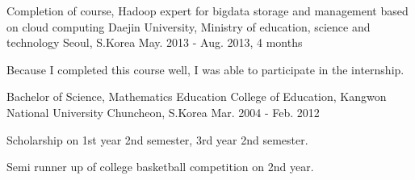 

\begin{cventries}

  \cventry
    {Completion of course, Hadoop expert for bigdata storage and management based on cloud computing} %
    {Daejin University, Ministry of education, science and technology} %
    {Seoul, S.Korea} %
    {May. 2013 - Aug. 2013, 4 months} %
    {
      \begin{cvitems} %
        \item {Because I completed this course well, I was able to participate in the internship.}
      \end{cvitems}
    }

  \cventry
    {Bachelor of Science, Mathematics Education} %
    {College of Education, Kangwon National University} %
    {Chuncheon, S.Korea} %
    {Mar. 2004 - Feb. 2012} %
    {
      \begin{cvitems} %
        \item {Scholarship on 1st year 2nd semester, 3rd year 2nd semester.}
        \item {Semi runner up of college basketball competition on 2nd year.}
      \end{cvitems}
    }

\end{cventries}

